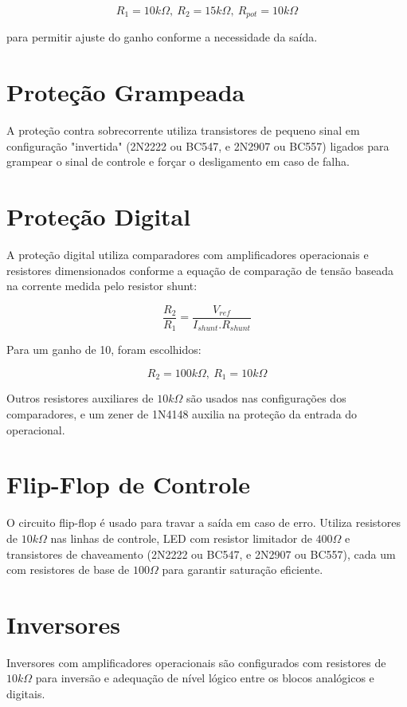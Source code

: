 \documentclass[
	12pt,				%
	oneside,			%
	a4paper,			%
	chapter=TITLE,
	sumario=tradicional,
	english,			%
	brazil				%
]{abntex2}
\begin{document}
$$R_1=10k\Omega,\ R_2=15k\Omega,\ R_{pot} = 10k\Omega$$

para permitir ajuste do ganho conforme a necessidade da saída.

\section{Proteção Grampeada}

A proteção contra sobrecorrente utiliza transistores de pequeno sinal em configuração "invertida" (2N2222 ou BC547, e 2N2907 ou BC557) ligados para grampear o sinal de controle e forçar o desligamento em caso de falha.

\section{Proteção Digital}

A proteção digital utiliza comparadores com amplificadores operacionais e resistores dimensionados conforme a equação de comparação de tensão baseada na corrente medida pelo resistor shunt:

$$ \frac{R_2}{R_1} = \frac{V_{ref}}{I_{shunt}.R_{shunt}}$$

Para um ganho de 10, foram escolhidos:

$$R_2 = 100k\Omega,\ R_1 = 10k\Omega$$

Outros resistores auxiliares de \(10k\Omega\) são usados nas configurações dos comparadores, e um zener de 1N4148 auxilia na proteção da entrada do operacional.

\section{Flip-Flop de Controle}

O circuito flip-flop é usado para travar a saída em caso de erro. Utiliza resistores de \(10k\Omega\) nas linhas de controle, LED com resistor limitador de \(400\Omega\) e transistores de chaveamento (2N2222 ou BC547, e 2N2907 ou BC557), cada um com resistores de base de \(100\Omega\) para garantir saturação eficiente.

\section{Inversores}

Inversores com amplificadores operacionais são configurados com resistores de \(10k\Omega\) para inversão e adequação de nível lógico entre os blocos analógicos e digitais.
\end{document}
